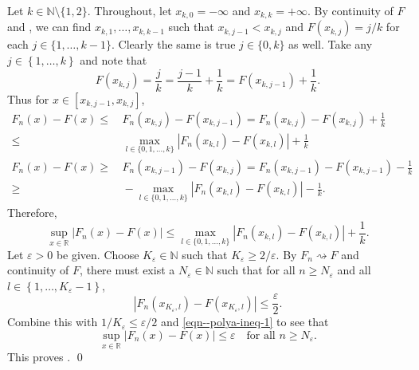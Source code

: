 Let \(k \in \mathbb{N} \setminus \{1, 2\}\).
Throughout, let \(x_{k, 0} = - \infty\) and \(x_{k, k} = + \infty\).
By continuity of \(F\) and , we can find
\(x_{k, 1}, \dots, x_{k, k - 1}\) such that \(x_{k, j - 1} < x_{k, j}\) and
\(F \left( x_{k, j} \right) = j / k\) for each \(j \in \{1, \dots, k - 1\}\).
Clearly the same is true \(j \in \{0, k\}\) as well.
Take any \(j \in \left\{ 1, \dots, k \right\}\) and note that
\begin{equation*}
  F \left( x_{k, j} \right) = \frac{j}{k} = \frac{j - 1}{k} + \frac{1}{k} = F
  \left( x_{k, j - 1} \right) + \frac{1}{k}.
\end{equation*}
Thus for \(x \in \left[ x_{k, j - 1}, x_{k, j} \right]\),
\begin{align*}
  F_{n} (x) - F (x) \leq
  & \, F_{n} \left( x_{k, j} \right) - F \left( x_{k, j - 1} \right) = F_{n}
  \left( x_{k, j} \right) - F \left( x_{k, j} \right) + \frac{1}{k} \\
  \leq
  & \, \max_{l \in \{0, 1, \dots, k\}} \left| F_{n} \left( x_{k, l} \right) - F
  \left( x_{k, l} \right) \right| + \frac{1}{k} \\
  F_{n} (x) - F (x) \geq
  & \, F_{n} \left( x_{k, j - 1} \right) - F \left( x_{k, j} \right) = F_{n}
  \left( x_{k, j - 1} \right) - F \left( x_{k, j - 1} \right) - \frac{1}{k} \\
  \geq
  & \, - \max_{l \in \{0, 1, \dots, k\}} \left| F_{n} \left( x_{k, l}
  \right) - F \left( x_{k, l} \right) \right| - \frac{1}{k}.
\end{align*}
Therefore,
\begin{equation}
  \sup_{x \in \mathbb{R}} \left| F_{n} (x) - F (x) \right| \leq
  \max_{l \in \{0, 1, \dots, k\}} \left| F_{n} \left( x_{k, l}
  \right) - F \left( x_{k, l} \right) \right| + \frac{1}{k}.
  \label{eqn--polya-ineq-1}
\end{equation}
Let \(\varepsilon > 0\) be given.
Choose \(K_{\varepsilon} \in \mathbb{N}\) such that \(K_{\varepsilon} \geq 2 /
\varepsilon\).
By \(F_{n} \rightsquigarrow F\) and continuity of \(F\), there must exist a
\(N_{\varepsilon} \in \mathbb{N}\) such that for all \(n \geq N_{\varepsilon}\)
and all \(l \in \left\{ 1, \dots, K_{\varepsilon} - 1 \right\}\),
\begin{equation*}
  \left| F_{n} \left( x_{K_{\varepsilon}, l} \right) - F \left(
  x_{K_{\varepsilon}, l} \right) \right| \leq \frac{\varepsilon}{2}.
\end{equation*}
Combine this with \(1 / K_{\varepsilon} \leq \varepsilon / 2\) and
\eqref{eqn--polya-ineq-1} to see that
\begin{equation*}
  \sup_{x \in \mathbb{R}} \left| F_{n} (x) - F (x) \right| \leq \varepsilon
  \quad \text{for all } n \geq N_{\varepsilon}.
\end{equation*}
This proves .
\qed

